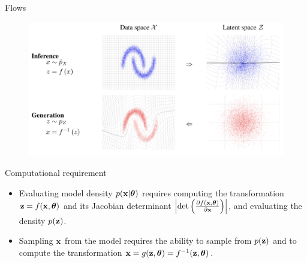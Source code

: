 \begin{frame}{Flows}
	\begin{figure}
		\includegraphics[width=0.7\linewidth]{figs/flows_how2.png}
	\end{figure}
	\vspace{-0.3cm}
	\begin{block}{Computational requirement}
		\vspace{-0.3cm}
		\begin{itemize}	
			\item Evaluating model density $p(\mathbf{x} | \boldsymbol{\theta})$ requires computing the transformation $\mathbf{z} = f(\mathbf{x},  \boldsymbol{\theta})$ and its Jacobian determinant $\left|\det \left( \frac{\partial f(\mathbf{x}, \boldsymbol{\theta})}{\partial \mathbf{x}} \right) \right|$,
			and evaluating the density $p(\mathbf{z})$.
			\item Sampling $\mathbf{x}$ from the model requires the ability to sample from $p(\mathbf{z})$ and to compute the transformation $\mathbf{x} = g(\mathbf{z}, \boldsymbol{\theta}) = f^{-1}(\mathbf{z}, \boldsymbol{\theta})$. 
		\end{itemize}
	\end{block}
\end{frame}
